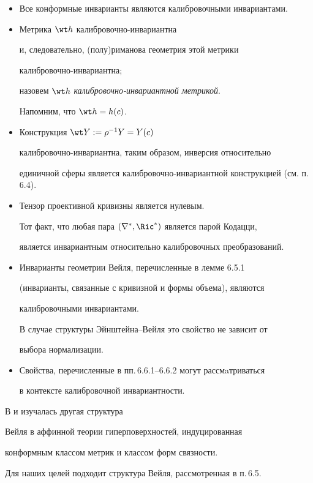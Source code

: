 \begin{itemize}

\item[(i)] Все конформные инварианты являются калибровочными инвариантами.

\item[(ii)] Метрика $\wt h$ калибровочно-инвариантна

и, следовательно, (полу)риманова геометрия этой метрики

калибровочно-инвариантна;

назовем $\wt h$ {\it калибровочно-инвариантной метрикой}.

Напомним, что $\wt h = h(c)$.

\item[(iii)] Конструкция $\wt Y := \rho^{-1}Y= Y(c)$

калибровочно-инвариантна, таким образом, инверсия относительно

единичной сферы является калибровочно-инвариантной конструкцией (см. п.\,6.4).

\item[(iv)] Тензор проективной кривизны является нулевым.

Тот факт, что любая пара $(\nabla^*, \Ric^*)$ является парой Кодацци, 

является инвариантным относительно калибровочных преобразований.

\item[(v)] Инварианты геометрии Вейля, перечисленные в лемме 6.5.1

(инварианты, связанные с кривизной и формы объема), являются

калибровочными инвариантами.

В случае структуры Эйнштейна--Вейля это свойство не зависит от

выбора нормализации.

\item[(vi)] Свойства, перечисленные в пп.\,6.6.1--6.6.2 могут рассмaтриваться

в контексте калибровочной инвариантности.

\end{itemize}



В \cite{MAT} и \cite{PEI} изучалась другая структура

Вейля в аффинной теории гиперповерхностей, индуцированная

конформным классом метрик и классом форм связности.

Для наших целей подходит структура Вейля, рассмотренная в п.\,6.5.

